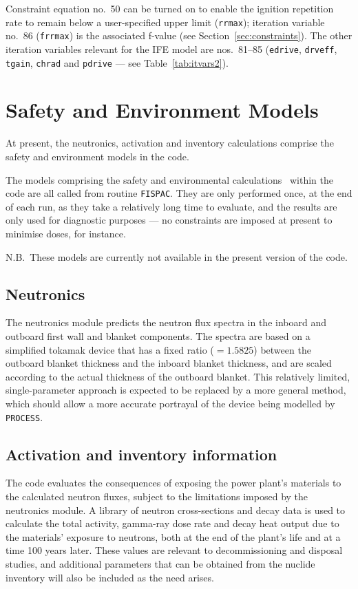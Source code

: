 \documentclass[11pt,a4paper]{report}
\newcommand{\process}{\mbox{\texttt{PROCESS}}}
\begin{document}
Constraint equation no.\ 50 can be turned on to enable the ignition repetition
rate to remain below a user-specified upper limit (\texttt{rrmax}); iteration
variable no.\ 86 (\texttt{frrmax}) is the associated f-value (see
Section~\ref{sec:constraints}). The other iteration variables relevant for the
IFE model are nos.~81--85 (\texttt{edrive}, \texttt{drveff}, \texttt{tgain},
\texttt{chrad} and \texttt{pdrive} --- see Table~\ref{tab:itvars2}).

\section{Safety and Environment Models}

At present, the neutronics, activation and inventory calculations comprise the
safety and environment models in the code.

The models comprising the safety and environmental calculations~\cite{FISPACT}
within the code are all called from routine \texttt{FISPAC}. They are only
performed once, at the end of each run, as they take a relatively long time to
evaluate, and the results are only used for diagnostic purposes --- no
constraints are imposed at present to minimise doses, for instance.

N.B.\ These models are currently not available in the present version of the
code.

\subsection{Neutronics}

The neutronics module predicts the neutron flux spectra in the inboard and
outboard first wall and blanket components. The spectra are based on a
simplified tokamak device that has a fixed ratio ($=1.5825$) between the
outboard blanket thickness and the inboard blanket thickness, and are scaled
according to the actual thickness of the outboard blanket. This relatively
limited, single-parameter approach is expected to be replaced by a more
general method, which should allow a more accurate portrayal of the device
being modelled by \process.

\subsection{Activation and inventory information}

The code evaluates the consequences of exposing the power plant's materials to
the calculated neutron fluxes, subject to the limitations imposed by the
neutronics module. A library of neutron cross-sections and decay data is used
to calculate the total activity, gamma-ray dose rate and decay heat output due
to the materials' exposure to neutrons, both at the end of the plant's life
and at a time 100 years later. These values are relevant to decommissioning
and disposal studies, and additional parameters that can be obtained from the
nuclide inventory will also be included as the need arises.
\end{document}
